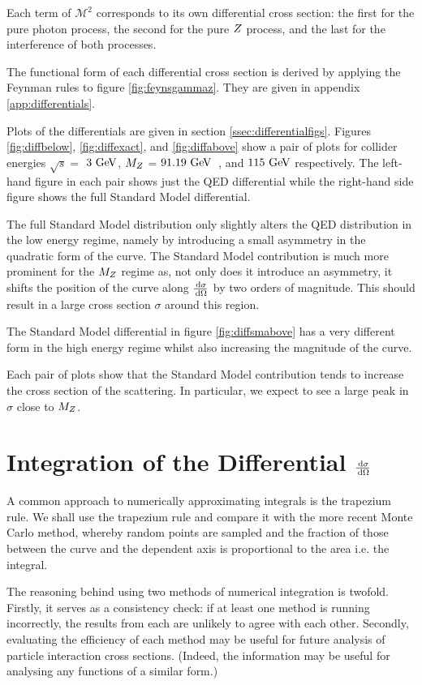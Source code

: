 \documentclass[]{article}
\begin{document}
Each term of $\mathcal{M}^{2}$ corresponds to its own differential cross section: the first for the pure photon process, the second for the pure $Z $ process, and the last for the interference of both processes.

The functional form of each differential cross section is derived by applying the Feynman rules to figure \ref{fig:feynsgammaz}. They are given in appendix \ref{app:differentials}.

Plots of the differentials are given in section \ref{ssec:differentialfigs}. Figures \ref{fig:diffbelow}, \ref{fig:diffexact}, and \ref{fig:diffabove} show a pair of plots for collider energies $\sqrt{s}=$ $3\GeV$, $M_{Z }$ = $91.19\GeV$~\cite{ref:pdg}, and $115\GeV$ respectively. The left-hand figure in each pair shows just the QED differential while the right-hand side figure shows the full Standard Model differential.

The full Standard Model distribution only slightly alters the QED distribution in the low energy regime, namely by introducing a small asymmetry in the quadratic form of the curve. The Standard Model contribution is much more prominent for the $M_{Z }$ regime as, not only does it introduce an asymmetry, it shifts the position of the curve along $\frac{\,\operatorname{d}\!{\sigma}}{\,\operatorname{d}\!{\Omega}}$ by two orders of magnitude. This should result in a large cross section $\sigma$ around this region.

The Standard Model differential in figure \ref{fig:diffsmabove} has a very different form in the high energy regime whilst also increasing the magnitude of the curve.

Each pair of plots show that the Standard Model contribution tends to increase the cross section of the scattering. In particular, we expect to see a large peak in $\sigma$ close to $M_{Z }$.

\section{Integration of the Differential $\frac{\,\operatorname{d}\!{\sigma}}{\,\operatorname{d}\!{\Omega}}$}\label{sec:integration}

A common approach to numerically approximating integrals is the trapezium rule. We shall use the trapezium rule and compare it with the more recent Monte Carlo method, whereby random points are sampled and the fraction of those between the curve and the dependent axis is proportional to the area i.e. the integral.

The reasoning behind using two methods of numerical integration is twofold. Firstly, it serves as a consistency check: if at least one method is running incorrectly, the results from each are unlikely to agree with each other. Secondly, evaluating the efficiency of each method may be useful for future analysis of particle interaction cross sections. (Indeed, the information may be useful for analysing any functions of a similar form.)
\end{document}
